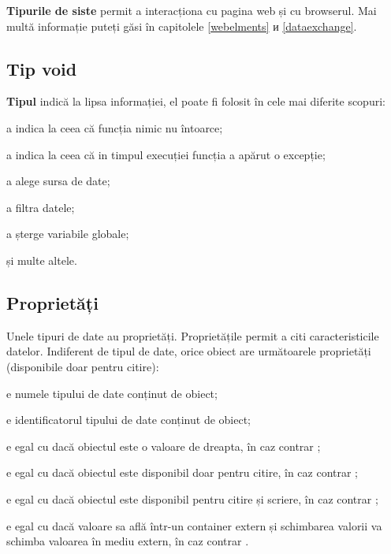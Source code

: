 {\bf Tipurile de siste} permit a interacționa cu pagina web și cu browserul. Mai multă informație puteți găsi în capitolele \ref{webelments} и \ref{dataexchange}.

\subsection{Tip {\color{lightblue} void}}

{\bf Tipul \void{}} indică la lipsa informației, el poate fi folosit în cele mai diferite scopuri:

\begin{icItems}
\item
	a indica la ceea că funcția nimic nu întoarce;
\item
	a indica la ceea că in timpul execuției funcția a apărut o excepție;
\item
	a alege sursa de date;
\item
	a filtra datele;
\item
	a șterge variabile globale;
\item
	și multe altele.
\end{icItems}


\subsection{Proprietăți}

Unele tipuri de date au proprietăți. Proprietățile permit a citi caracteristicile datelor. Indiferent de tipul de date, orice obiect are următoarele proprietăți (disponibile doar pentru citire):

\begin{icItems}
\item
	 e numele tipului de date conținut de obiect;
\item
	 e identificatorul tipului de date conținut de obiect;
\item
	 e egal cu \true{} dacă obiectul este o valoare de dreapta, în caz contrar \false{};
\item
	 e egal cu \true{} dacă obiectul este disponibil doar pentru citire, în caz contrar \false{};
\item
	 e egal cu \true{} dacă obiectul este disponibil pentru citire și scriere, în caz contrar \false{};
\item
	 e egal cu \true{} dacă valoare sa află într-un container extern și schimbarea valorii va schimba valoarea în mediu extern, în caz contrar \false{}.
\end{icItems}

